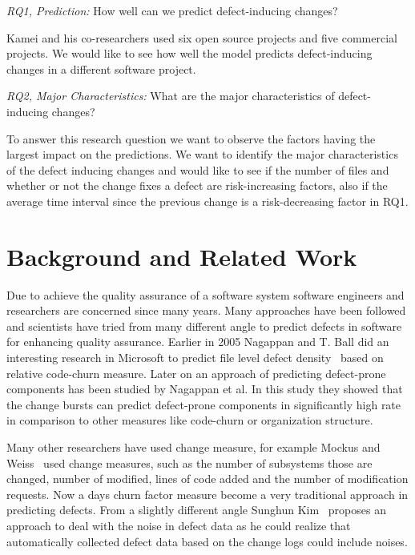 \documentclass[10pt, conference]{IEEEtran}
\begin{document}
\textit{RQ1, Prediction:} How well can we predict defect-inducing changes?

Kamei and his co-researchers used six open source projects and five commercial projects. We would like to see how well the model predicts defect-inducing changes in a different software project.

\textit{RQ2, Major Characteristics:} What are the major characteristics of defect-inducing changes?

To answer this research question we want to observe the factors having the largest impact on the predictions. We want to identify the major characteristics of the defect inducing changes and would like to see if the number of files and whether or not the change fixes a defect are risk-increasing factors, also if the average time interval since the previous change is a risk-decreasing factor in RQ1.

\section{Background and Related Work}
\label{sec:backgr-relat-work}

Due to achieve the quality assurance of a software system software engineers and researchers are concerned since many years. Many approaches have been followed and scientists have tried from many different angle to predict defects in software for enhancing quality assurance. Earlier in 2005 Nagappan and T. Ball did an interesting research in Microsoft to predict file level defect density~\cite{Nagappan2005ICSE} based on relative code-churn measure. Later on an approach of predicting defect-prone components has been studied by Nagappan et al. In this study they showed that the change bursts can predict defect-prone components in significantly high rate in comparison to other measures like code-churn or organization structure.

Many other researchers have used change measure, for example Mockus and Weiss~\cite{Mockus2000Bell} used change measures, such as the number of subsystems those are changed, number of modified, lines of code added and the number of modification requests. Now a days churn factor measure become a very traditional approach in predicting defects. From a slightly different angle Sunghun Kim~\cite{Kim2011ICSE} proposes an approach to deal with the noise in defect data as he could realize that automatically collected defect data based on the change logs could include noises.
\end{document}
